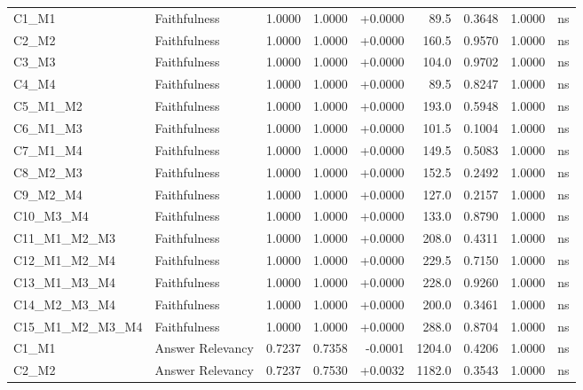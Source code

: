 \begin{table}[p]
\begin{tabular*}{\textwidth}{@{\extracolsep{\fill}} l l r r r r r r c @{}}
\addlinespace
C1\_M1          & Faithfulness         & 1.0000 & 1.0000 & +0.0000 & 89.5 & 0.3648 & 1.0000 & ns \\
\addlinespace
C2\_M2          & Faithfulness         & 1.0000 & 1.0000 & +0.0000 & 160.5 & 0.9570 & 1.0000 & ns \\
\addlinespace
C3\_M3          & Faithfulness         & 1.0000 & 1.0000 & +0.0000 & 104.0 & 0.9702 & 1.0000 & ns \\
\addlinespace
C4\_M4          & Faithfulness         & 1.0000 & 1.0000 & +0.0000 & 89.5 & 0.8247 & 1.0000 & ns \\
\addlinespace
C5\_M1\_M2      & Faithfulness         & 1.0000 & 1.0000 & +0.0000 & 193.0 & 0.5948 & 1.0000 & ns \\
\addlinespace
C6\_M1\_M3      & Faithfulness         & 1.0000 & 1.0000 & +0.0000 & 101.5 & 0.1004 & 1.0000 & ns \\
\addlinespace
C7\_M1\_M4      & Faithfulness         & 1.0000 & 1.0000 & +0.0000 & 149.5 & 0.5083 & 1.0000 & ns \\
\addlinespace
C8\_M2\_M3      & Faithfulness         & 1.0000 & 1.0000 & +0.0000 & 152.5 & 0.2492 & 1.0000 & ns \\
\addlinespace
C9\_M2\_M4      & Faithfulness         & 1.0000 & 1.0000 & +0.0000 & 127.0 & 0.2157 & 1.0000 & ns \\
\addlinespace
C10\_M3\_M4     & Faithfulness         & 1.0000 & 1.0000 & +0.0000 & 133.0 & 0.8790 & 1.0000 & ns \\
\addlinespace
C11\_M1\_M2\_M3 & Faithfulness         & 1.0000 & 1.0000 & +0.0000 & 208.0 & 0.4311 & 1.0000 & ns \\
\addlinespace
C12\_M1\_M2\_M4 & Faithfulness         & 1.0000 & 1.0000 & +0.0000 & 229.5 & 0.7150 & 1.0000 & ns \\
\addlinespace
C13\_M1\_M3\_M4 & Faithfulness         & 1.0000 & 1.0000 & +0.0000 & 228.0 & 0.9260 & 1.0000 & ns \\
\addlinespace
C14\_M2\_M3\_M4 & Faithfulness         & 1.0000 & 1.0000 & +0.0000 & 200.0 & 0.3461 & 1.0000 & ns \\
\addlinespace
C15\_M1\_M2\_M3\_M4 & Faithfulness         & 1.0000 & 1.0000 & +0.0000 & 288.0 & 0.8704 & 1.0000 & ns \\
\addlinespace
C1\_M1          & Answer Relevancy     & 0.7237 & 0.7358 & -0.0001 & 1204.0 & 0.4206 & 1.0000 & ns \\
\addlinespace
C2\_M2          & Answer Relevancy     & 0.7237 & 0.7530 & +0.0032 & 1182.0 & 0.3543 & 1.0000 & ns \\

\end{tabular*}
\end{table}
